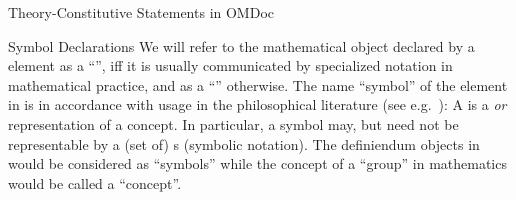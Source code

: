 \begin{omgroup}[short=Mathematical Statements,id=statements]
\begin{omgroup}[id=constitutive-statements]{Theory-Constitutive Statements in OMDoc}
\begin{module}[id=constitutive-statements]
\begin{omgroup}[id=symbol-dec]{Symbol Declarations}
We will refer to the mathematical object declared by a {} element as a
``{}'', iff it is usually communicated by specialized notation in
mathematical practice, and as a ``{}'' otherwise.  The name ``symbol''
of the {} element in {\omdoc} is in accordance with usage in the
philosophical literature (see e.g.~\cite{NewSim:cseisas81}): A {} is a
{\emph{{} or
    {}}} representation of a concept.  In
particular, a symbol may, but need not be representable by a (set of) {s}
(symbolic notation).  The definiendum objects in {} would be considered
as ``symbols'' while the concept of a ``group'' in mathematics would be called a
``concept''.
  

\end{omgroup}
\end{module}
\end{omgroup}
\end{omgroup}
